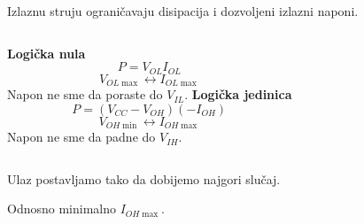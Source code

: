 \begin{frame}[label=08-s030]
Izlaznu struju ograničavaju disipacija i dozvoljeni izlazni naponi.\par\medskip
\begin{columns}[T,onlytextwidth]
\textbf{Logička nula}
\[P=V_{OL}I_{OL}\]
\[V_{OL\max}\leftrightarrow I_{OL\max}\]
Napon ne sme da poraste do $V_{IL}$.
\textbf{Logička jedinica}
\[P=(V_{CC}-V_{OH})(-I_{OH})\]
\[V_{OH\min}\leftrightarrow I_{OH\max}\]
Napon ne sme da padne do $V_{IH}$.
\end{columns}\medskip
Ulaz postavljamo tako da dobijemo najgori slučaj.\par
Odnosno \alert{minimalno $I_{OH\max}$}.
\end{frame}
